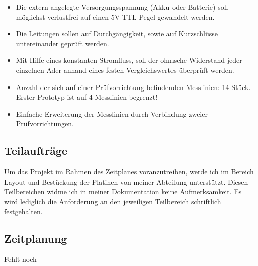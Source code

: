 \documentclass[a4paper,11pt]{scrartcl}
\begin{document}
\begin{itemize}
	\item{Die extern angelegte Versorgungsspannung (Akku oder Batterie) soll möglichst verlustfrei auf einen 5V TTL-Pegel gewandelt werden. }

	\item{Die Leitungen sollen auf Durchgängigkeit, sowie auf Kurzschlüsse untereinander geprüft werden.}
	
	\item{Mit Hilfe eines konstanten Stromfluss, soll der ohmsche Widerstand jeder einzelnen Ader anhand eines festen Vergleichswertes überprüft werden.}
	
	\item{Anzahl der sich auf einer Prüfvorrichtung befindenden Messlinien: 14 Stück.
Erster Prototyp ist auf 4 Messlinien begrenzt!}

	\item{Einfache Erweiterung der Messlinien durch Verbindung zweier Prüfvorrichtungen.}
\end{itemize}


\subsection{Teilaufträge}
Um das Projekt im Rahmen des Zeitplanes voranzutreiben, werde ich im Bereich Layout und Bestückung der Platinen von meiner Abteilung unterstützt. Diesen Teilbereichen widme ich in meiner Dokumentation keine Aufmerksamkeit. Es wird lediglich die Anforderung an den jeweiligen Teilbereich schriftlich festgehalten.

\newpage

\subsection{Zeitplanung}
Fehlt noch
\end{document}
